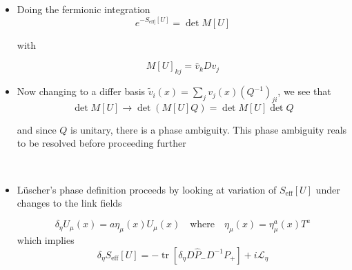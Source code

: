 \begin{itemize}
Writing
\begin{equation} 
\begin{array}{llrl}
& \psi(x)=\sum_{j} v_{j}(x) c_{j} & \text { with } & \hat{\gamma}_{5} v_{j}=-v_{j} \\
& \bar{\psi}(x)=\sum_{k} \bar{v}_{k}(x) \bar{c}_{k}& \text { with } & \bar{v}_{k} \gamma_{5}=\bar{v}_{k} \\
\end{array}
\end{equation}
where $v_j$ is an orthonormal set of basis functions since $\hat\gamma_5$ is Hermitian
and 
$c_{j}, \bar{c}_{k}$ are Grassman. Thus the measure can be written as
\begin{equation}
     D \psi_{\text {loft }}=\prod_{j} d c_{j}, \quad D \bar{\psi}_{\text {left }}=\prod_{k} d \bar{c}_{k}
\end{equation}

  \item Doing the fermionic integration
\begin{equation}
    e^{-S_{\text{eff}]}[U]}=\operatorname{det} M[U]
\end{equation}

with

\begin{equation}
M[U]_{k j}=\bar{v}_{k} D v_{j}
\end{equation}


  \item Now changing to a differ basis
  \(\tilde{v}_{i}(x)=\sum_{j} v_j(x)\left(Q^{-1}\right)_{ji}\), we see that
\begin{equation}
    \operatorname{det} M[U] \rightarrow \operatorname{det}(M[U] Q)=\operatorname{det} M[U] \operatorname{det} Q
\end{equation}

and since \(Q \) is unitary, there is a phase ambiguity.
This phase ambiguity reals to be resolved before proceeding further

\ \item L\"uscher's phase definition proceeds by looking at variation of $S_{\text{eff}} [U]$ under changes to the link fields

\begin{equation}
\delta_{\eta} U_{\mu}(x)=a \eta_{\mu}(x) U_{\mu}(x) \quad \text{where} \quad\eta_{\mu}(x)=\eta_{\mu}^{a}(x) T^{a}
\end{equation}
which implies
\begin{equation}
 \delta_{\eta} S_{\text{eff}}[U]=-\operatorname{tr}\left[\delta_{\eta} D \hat{P}_{-} D^{-1} P_{+}\right]+i \mathcal{L}_{\eta}
\end{equation}



\end{itemize}
